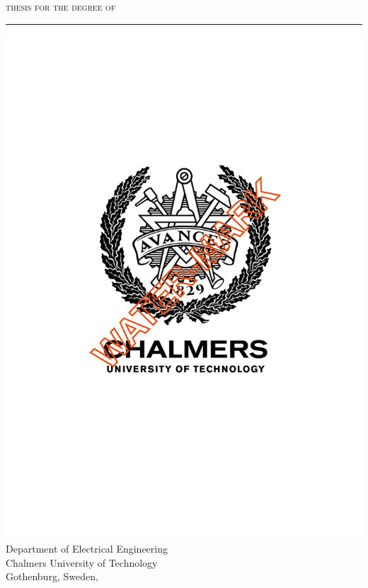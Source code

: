 \documentclass[
  paper=16.9cm:23.9cm,
  pagesize,
  twoside,
  10pt,
  chapterprefix,
  headsepline=on,
  footinclude=off,
  DIV=18,
  BCOR=7mm,
  bibliography=totoc,
  numbers=noenddot,
  open=right,
]{scrreprt}
\begin{document}
\thispagestyle{empty}

\begin{center}
\textsc{thesis for the degree of \TheThesisType}
\vspace{0.5cm}
\hrule
\vspace{3 cm}
{\Large {\TitlePageTitle}\par}
\vspace{1 cm}
{\large\textsc{\TitlePageName}\par}
\vspace{2 cm}
\includegraphics[scale=0.25]{TemplateFiles/logos/title_page.jpg}
\vfill
\vspace{0.5 cm}
Department of Electrical Engineering \\
Chalmers University of Technology \\
Gothenburg, Sweden, \TheYear
\end{center}
\end{document}
